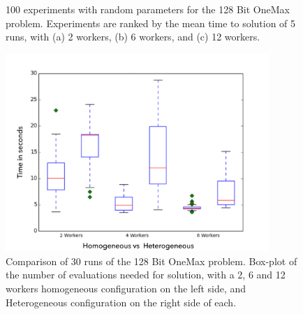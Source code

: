 \documentclass{llncs}
\begin{document}
\begin{figure}[b]
    \centering

    \caption{100 experiments with random parameters for the 128 Bit OneMax problem.
    Experiments are ranked by the mean time to solution of 5 runs, with   
    (a) 2 workers, (b) 6 workers, and (c) 12 workers.}
    \label{fig:effort}
\end{figure}


\begin{figure}[t]
    \centering
        \includegraphics[width=10cm]{img/one_max_comp.png}
    \caption{Comparison of 30 runs of the 128 Bit OneMax problem. 
    Box-plot of the number of evaluations needed for solution, with a 2, 6 and 12 workers
    homogeneous configuration on the left side, and Heterogeneous configuration on the
    right side of each.
    }
    \label{fig:comp-onemax}
\end{figure}
\end{document}
